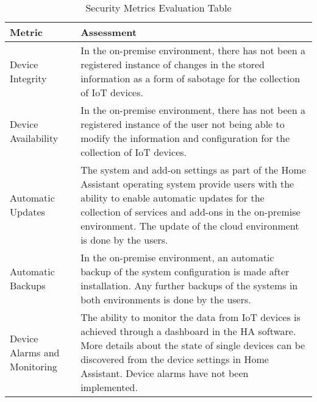 \begin{table}[H]
    \centering
    \begin{tabular}{|p{4cm}|p{8cm}|}
        \hline
        Metric & Assessment \\
        \hline 
        Device Integrity & In the on-premise environment, there has not been a registered instance of changes in the stored information as a form of sabotage for the collection of IoT devices. \\
        \hline
        Device Availability & In the on-premise environment, there has not been a registered instance of the user not being able to modify the information and configuration for the collection of IoT devices. \\
        \hline
        Automatic Updates & The system and add-on settings as part of the Home Assistant operating system provide users with the ability to enable automatic updates for the collection of services and add-ons in the on-premise environment. The update of the cloud environment is done by the users. \\
        \hline
        Automatic Backups & In the on-premise environment, an automatic backup of the system configuration is made after installation. Any further backups of the systems in both environments is done by the users.\\
        \hline
        Device Alarms and Monitoring & The ability to monitor the data from IoT devices is achieved through a dashboard in the HA software. More details about the state of single devices can be discovered from the device settings in Home Assistant. Device alarms have not been implemented. \\
        \hline
    \end{tabular}
    \caption{Security Metrics Evaluation Table}
\end{table}

